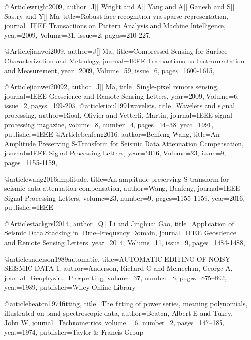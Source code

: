 @Article{wright2009,
  author={J[] Wright and A[] Yang and A[] Ganesh and S[] Sastry and Y[] Ma},
  title={Robust face recognition via sparse representation},
  journal={IEEE Transactions on Pattern Analysis and Machine Intelligence},
  year=2009,
  Volume=31,
  issue=2,
  pages={210-227},
}

@Article{jianwei2009,
  author={J[] Ma},
  title={Compressed Sensing for Surface Characterization and Metrology},
  journal={IEEE Transactions on Instrumentation and Measurement},
  year=2009,
  Volume=59,
  issue=6,
  pages={1600-1615},
}

@Article{jianwei20092,
  author={J[] Ma},
  title={Single-pixel remote sensing},
  journal={IEEE Geoscience and Remote Sensing Letters},
  year=2009,
  Volume=6,
  issue=2,
  pages={199-203},
}
@article{rioul1991wavelets,
  title={Wavelets and signal processing},
  author={Rioul, Olivier and Vetterli, Martin},
  journal={IEEE signal processing magazine},
  volume={8},
  number={4},
  pages={14--38},
  year={1991},
  publisher={IEEE}
}
@Article{benfeng2016,
  author={Benfeng Wang},
  title={An Amplitude Preserving S-Transform for Seismic Data Attenuation Compensation},
  journal={IEEE Signal Processing Letters},
  year=2016,
  Volume=23,
  issue=9,
  pages={1155-1159},
}

@article{wang2016amplitude,
  title={An amplitude preserving S-transform for seismic data attenuation compensation},
  author={Wang, Benfeng},
  journal={IEEE Signal Processing Letters},
  volume={23},
  number={9},
  pages={1155--1159},
  year={2016},
  publisher={IEEE}
}

 @Article{stackgrsl2014,
  author={Q[] Li and Jinghuai Gao},
  title={Application of Seismic Data Stacking in Time–Frequency Domain},
  journal={IEEE Geoscience and Remote Sensing Letters},
  year=2014,
  Volume=11,
  issue=9,
  pages={1484-1488},
}




@article{anderson1989automatic,
  title={AUTOMATIC EDITING OF NOISY SEISMIC DATA 1},
  author={Anderson, Richard G and Mcmechan, George A},
  journal={Geophysical Prospecting},
  volume={37},
  number={8},
  pages={875--892},
  year={1989},
  publisher={Wiley Online Library}
}

@article{beaton1974fitting,
  title={The fitting of power series, meaning polynomials, illustrated on band-spectroscopic data},
  author={Beaton, Albert E and Tukey, John W},
  journal={Technometrics},
  volume={16},
  number={2},
  pages={147--185},
  year={1974},
  publisher={Taylor \& Francis Group}
}


